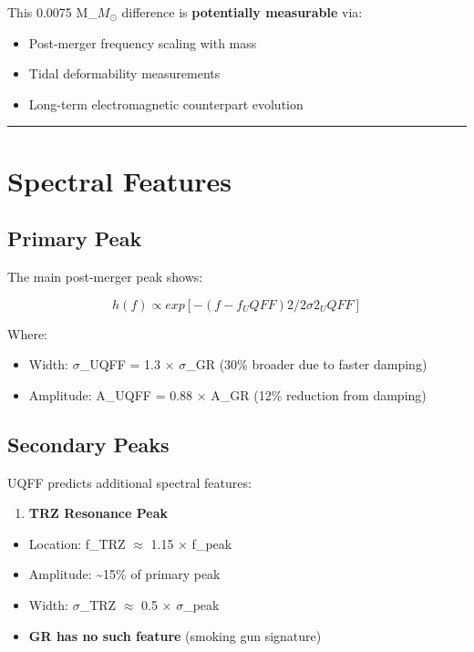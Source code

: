 \documentclass[12pt,a4paper]{article}
\begin{document}
This 0.0075 M\_{$M_{\odot}$} difference is \textbf{potentially measurable} via:

\begin{itemize}
  \item Post-merger frequency scaling with mass
  \item Tidal deformability measurements
  \item Long-term electromagnetic counterpart evolution
\end{itemize}

\medskip\hrule\medskip

\section{Spectral Features}

\subsection{Primary Peak}

The main post-merger peak shows:

\begin{equation}
h(f) \propto exp[-(f - f_UQFF)2 / 2\sigma2_UQFF]
\end{equation}

Where:

\begin{itemize}
  \item Width: $\sigma$\_UQFF = 1.3 $\times$ $\sigma$\_GR (30\% broader due to faster damping)
  \item Amplitude: A\_UQFF = 0.88 $\times$ A\_GR (12\% reduction from damping)
\end{itemize}

\subsection{Secondary Peaks}

UQFF predicts additional spectral features:

\begin{enumerate}
  \item \textbf{TRZ Resonance Peak}
\end{enumerate}

\begin{itemize}
  \item Location: f\_TRZ $\approx$ 1.15 $\times$ f\_peak
  \item Amplitude: \textasciitilde{}15\% of primary peak
  \item Width: $\sigma$\_TRZ $\approx$ 0.5 $\times$ $\sigma$\_peak
  \item \textbf{GR has no such feature} (smoking gun signature)
\end{itemize}
\end{document}
